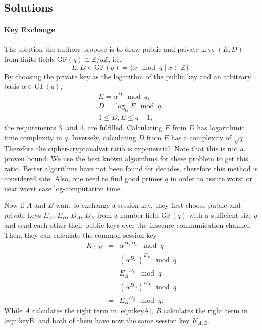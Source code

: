 \documentclass[paper=a4, fontsize=11pt]{scrartcl} %
\numberwithin{equation}{section} %
\numberwithin{figure}{section} %
\numberwithin{table}{section} %
\begin{document}
\subsection{Solutions}
\paragraph{Key Exchange}
The solution the authors propose is to draw public and private keys $(E,D)$ from finite fields $\mathrm{GF}(q)\cong\mathbb{Z}/q\mathbb{Z}$, i.e.
\begin{equation}
E, D \in \mathrm{GF}(q) = \{x \mod q \mid x \in \mathbb{Z}\}.
\end{equation}
By choosing the private key as the logarithm of the public key and an arbitrary basis $\alpha \in \mathrm{GF}(q)$,
\begin{eqnarray}
E = \alpha^D\mod q,\\
D = \log_\alpha E \mod q,\\
1 \leq D,E \leq q-1,
\end{eqnarray}
the requirements 3. and 4. are fulfilled. Calculating $E$ from $D$ has logarithmic time complexity in $q$. Inversely, calculating $D$ from $E$ has a complexity of $\sqrt{q}$. Therefore the cipher-cryptanalyst ratio is exponential. Note that this is not a proven bound. We use the best known algorithms for these problem to get this ratio. Better algorithms have not been found for decades, therefore this method is considered safe. Also, one need to find good primes $q$ in order to assure worst or near worst case log-computation time.

Now if $A$ and $B$ want to exchange a session key, they first choose public and private keys $E_A$, $E_B$, $D_A$, $D_B$ from a number field $\mathrm{GF}(q)$ with a sufficient size $q$ and send each other their public keys over the insecure communication channel. Then, they can calculate the common session key
\begin{eqnarray}
K_{A,B} & = & \alpha^{D_AD_B} \mod q\\
& = & (\alpha^{D_A})^{D_B} \mod q\\
& = & {E_A}^{D_B} \mod q\label{eqn:keyA}\\
& = & (\alpha^{D_B})^{D_A} \mod q\\
& = & {E_B}^{D_A} \mod q.\label{eqn:keyB}
\end{eqnarray}
While $A$ calculates the right term in \ref{eqn:keyA}, $B$ calculates the right term in \ref{eqn:keyB} and both of them have now the same session key $K_{A,B}$.
\end{document}
